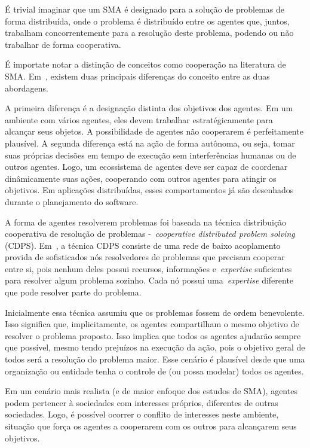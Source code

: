 É trivial imaginar que um SMA é designado para a solução de problemas de forma distribuída, onde o problema é distribuído entre os agentes que, juntos, trabalham concorrentemente para a resolução deste problema, podendo ou não trabalhar de forma cooperativa.

É importate notar a distinção de conceitos como cooperação na literatura de SMA. Em~\cite{wooldridge04}, existem duas principais diferenças do conceito entre as duas abordagens.

A primeira diferença é a designação distinta dos objetivos dos agentes. Em um ambiente com vários agentes, eles devem trabalhar estratégicamente para alcançar seus objetos. A possibilidade de agentes não cooperarem é perfeitamente plausível. A segunda diferença está na ação de forma autônoma, ou seja, tomar suas próprias decisões em tempo de execução sem interferências humanas ou de outros agentes. Logo, um ecossistema de agentes deve ser capaz de coordenar dinâmicamente suas ações, cooperando com outros agentes para atingir os objetivos. Em aplicações distribuídas, esses comportamentos já são desenhados durante o planejamento do software.

A forma de agentes resolverem problemas foi baseada na técnica distribuição cooperativa de resolução de problemas -~\emph{cooperative distributed problem solving} (CDPS). Em~\cite{durfee89}, a técnica CDPS consiste de uma rede de baixo acoplamento provida de sofisticados nós resolvedores de problemas que precisam cooperar entre si, pois nenhum deles possui recursos, informações e~\emph{expertise} suficientes para resolver algum problema sozinho. Cada nó possui uma~\emph{expertise} diferente que pode resolver parte do problema.

Inicialmente essa técnica assumiu que os problemas fossem de ordem benevolente. Isso significa que, implicitamente, os agentes compartilham o mesmo objetivo de resolver o problema proposto. Isso implica que todos os agentes ajudarão sempre que possível, mesmo tendo prejuízos na execução da ação, pois o objetivo geral de todos será a resolução do problema maior. Esse cenário é plausível desde que uma organização ou entidade tenha o controle de (ou possa modelar) todos os agentes.

Em um cenário mais realista (e de maior enfoque dos estudos de SMA), agentes podem pertencer à sociedades com interesses próprios, diferentes de outras sociedades. Logo, é possível ocorrer o conflito de interesses neste ambiente, situação que força os agentes a cooperarem com os outros para alcançarem seus objetivos.


